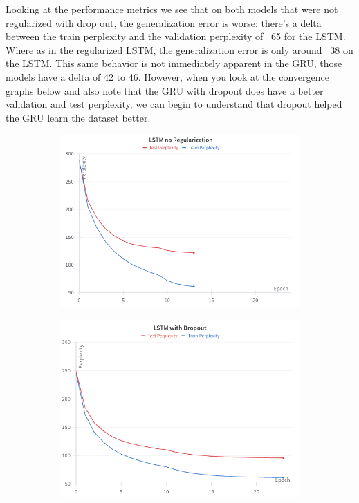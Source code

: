 \documentclass{article}
\begin{document}
Looking at the performance metrics we see that on both models that were not regularized with drop out, the generalization error is worse: there's a delta between the train perplexity and the validation perplexity of ~65 for the LSTM. Where as in the regularized LSTM, the generalization error is only around ~38 on the LSTM. This same behavior is not immediately apparent in the GRU, those models have a delta of 42 to 46. However, when you look at the convergence graphs below and also note that the GRU with dropout does have a better validation and test perplexity, we can begin to understand that dropout helped the GRU learn the dataset better.



\begin{figure}[ht] %
    \centering

    \caption{Convergence Graphs of Models}
    \label{fig:Convergence}

    \begin{subfigure}[b]{0.45\textwidth}
        \centering
        \includegraphics[width=\linewidth]{../src/lstm_noreg.png}
    \end{subfigure}
    \hfill
    \begin{subfigure}[b]{0.45\textwidth}
        \centering
        \includegraphics[width=\linewidth]{../src/lstm_drop.png}
    \end{subfigure}
    

\end{figure}
\end{document}
